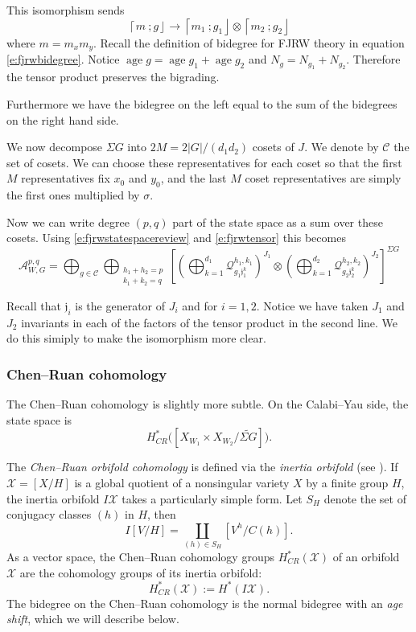 \documentclass[10pt, letterpaper]{amsart}
\theoremstyle{remark}
\newcommand{\cX}{\mathcal{X}}
\newcommand{\cC}{\mathcal{C}}
\newcommand{\sA}{\mathscr{A}}
\newcommand{\sQ}{\mathscr{Q}}
\newcommand{\fjrw}[2]{ \left\lceil #1 \:; #2 \right\rfloor }
\newcommand{\jw}{\mathfrak{j}}
\newcommand{\s}[1]{\Sigma #1}
\DeclareMathOperator{\age}{age}
\begin{document}
This isomorphism sends
\[
\fjrw{m}{g}\to \fjrw{m_1}{g_1}\otimes\fjrw{m_2}{g_2}
\]
where $m=m_xm_y$. Recall the definition of bidegree for FJRW theory in equation \eqref{e:fjrwbidegree}. Notice $\age g=\age g_1+\age g_2$ and $N_g=N_{g_1}+N_{g_2}$. Therefore the tensor product preserves the bigrading.  

Furthermore we have the bidegree on the left equal to the sum of the bidegrees on the right hand side. 

We now decompose $\s{G}$ into $2M=2|G|/(d_1d_2)$ cosets of $J$. We denote by $\cC$ the set of cosets. We can choose these representatives for each coset so that the first $M$ representatives fix $x_0$ and $y_0$, and the last $M$ coset representatives are simply the first ones multiplied by $\sigma$.  %

Now we can write degree $(p,q)$ part of the state space as a sum over these cosets. Using \eqref{e:fjrwstatespacereview} and \eqref{e:fjrwtensor} this becomes
\begin{equation}\label{e:FJRWdecomposition}
\sA_{W,G}^{p,q}=\bigoplus_{g\in \cC}\bigoplus_{\substack{h_1+h_2=p\\k_1+k_2=q}}\left[\left(\bigoplus_{k=1}^{d_1}\sQ_{g_1\jw_1^k}^{h_1,k_1}\right)^{J_1}\otimes\left(\bigoplus_{k=1}^{d_2}\sQ_{g_2\jw_2^k}^{h_2,k_2}\right)^{J_2}\right]^{\s{G}}    
\end{equation}

Recall that $\jw_i$ is the generator of $J_i$ and for $i=1,2$. Notice we have taken $J_1$ and $J_2$ invariants in each of the factors of the tensor product in the second line. We do this simiply to make the isomorphism more clear. 


\subsubsection{Chen--Ruan cohomology}
The Chen--Ruan cohomology is slightly more subtle. On the Calabi--Yau side, the state space is %
\[
H^*_{CR}\Big(\left[X_{W_1}\times X_{W_2}/\widetilde{\s{G}}\right]\Big).
\]

The \emph{Chen--Ruan orbifold cohomology} is defined via the \emph{inertia orbifold} (see \cite{ChenR1}).
If $\cX = [X/H]$ is a global quotient of a nonsingular
variety $X$ by a finite group $H$, the inertia orbifold $I\cX$ takes a particularly simple form.
Let $S_H$ denote the set of conjugacy classes $(h)$ in $H$,
then
\[
I [V/H] = \coprod_{(h) \in S_H} [ V^h/C(h) ].
\]
As a vector space, the Chen--Ruan cohomology groups $H^*_{CR}(\cX)$ 
of an orbifold $\cX$ are the cohomology groups of 
its inertia orbifold:
\[
H_{CR}^*(\cX) := H^*(I\cX).
\]
The bidegree on the Chen--Ruan cohomology is the normal bidegree with an \emph{age shift}, which we will describe below. 
\end{document}
